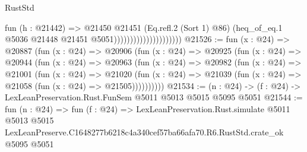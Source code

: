 \begin{lexlean}{RustStd}
\begin{coremodule}
                                          fun (h : @21442) =>
                                          @21450
                                            @21451
                                            (Eq.refl.{2} (Sort 1) @86)
                                            (heq_of_eq.{1}
                                              @5036
                                              @21448
                                              @21451
                                              @5051)))))))))))))))))))))
@21526 := fun (x : @24) =>
  @20887
    (fun (x : @24) =>
    @20906
      (fun (x : @24) =>
      @20925
        (fun (x : @24) =>
        @20944
          (fun (x : @24) =>
          @20963
            (fun (x : @24) =>
            @20982
              (fun (x : @24) =>
              @21001
                (fun (x : @24) =>
                @21020
                  (fun (x : @24) =>
                  @21039 (fun (x : @24) => @21058 (fun (x : @24) => @21505))))))))))
@21534 := (n : @24) -> (f : @24) -> LexLeanPreservation.Rust.FunSem @5011 @5013 @5015 @5095 @5051
@21544 := fun (n : @24) =>
  fun (f : @24) =>
  LexLeanPreservation.Rust.simulate
    @5011
    @5013
    @5015
    LexLeanPreserve.C1648277b6218c4a340cef57ba66afa70.R6.RustStd.crate_ok
    @5095
    @5051
\end{coremodule}
\end{lexlean}
